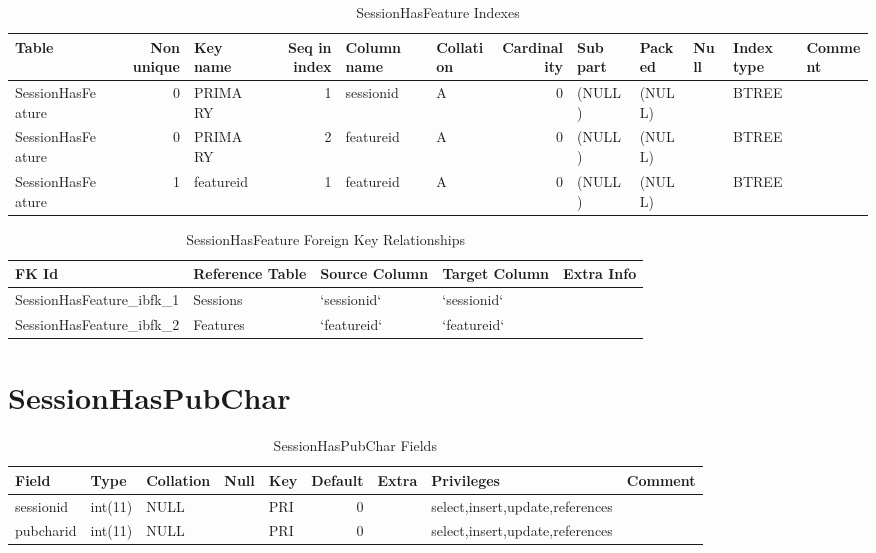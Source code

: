 \documentclass[captions=tablesignature]{scrartcl}
\begin{document}
\begin{table}[htb]
\caption{\label{tbl:sessionhasfeatureindexes}SessionHasFeature Indexes}
\centering
\begin{tabular}{lrlrllrlllll}
\hline
Table & Non unique & Key name & Seq in index & Column name & Collation & Cardinality & Sub part & Packed & Null & Index type & Comment\\
\hline
SessionHasFeature & 0 & PRIMARY & 1 & sessionid & A & 0 & (NULL) & (NULL) &  & BTREE & \\
SessionHasFeature & 0 & PRIMARY & 2 & featureid & A & 0 & (NULL) & (NULL) &  & BTREE & \\
SessionHasFeature & 1 & featureid & 1 & featureid & A & 0 & (NULL) & (NULL) &  & BTREE & \\
\hline
\end{tabular}
\end{table}

\begin{table}[htb]
\caption{\label{tbl:sessionhasfeaturefkr}SessionHasFeature Foreign Key Relationships}
\centering
\begin{tabular}{lllll}
\hline
FK Id & Reference Table & Source Column & Target Column & Extra Info\\
\hline
SessionHasFeature\_ibfk\_1 & Sessions & `sessionid` & `sessionid` & \\
SessionHasFeature\_ibfk\_2 & Features & `featureid` & `featureid` & \\
\hline
\end{tabular}
\end{table}
\section{SessionHasPubChar}
\label{sec-27}

\begin{table}[htb]
\caption{\label{tbl:sessionhaspubcharfields}SessionHasPubChar Fields}
\centering
\begin{tabular}{lllllrlll}
\hline
Field & Type & Collation & Null & Key & Default & Extra & Privileges & Comment\\
\hline
sessionid & int(11) & NULL &  & PRI & 0 &  & select,insert,update,references & \\
pubcharid & int(11) & NULL &  & PRI & 0 &  & select,insert,update,references & \\
\hline
\end{tabular}
\end{table}
\end{document}
